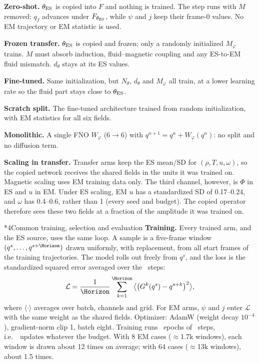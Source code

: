 \documentclass[10pt,letterpaper,twocolumn]{article}
\makeatletter
\renewcommand\section{\@startsection{section}{1}{0pt}{8pt}{4pt}{\normalfont\fontsize{11}{13}\bfseries}}
\makeatother
\begin{document}
\textbf{Zero-shot.} $\theta_{\rm ES}$ is copied into $F$ and nothing is trained.
The step runs with $M$ removed: $q_f$ advances under $F_{\theta_{\rm ES}}$, while $\psi$ and $j$ keep their frame-0 values.
No EM trajectory or EM statistic is used.

\textbf{Frozen transfer.} $\theta_{\rm ES}$ is copied and frozen; only a randomly initialized $M_\varphi$ trains.
$M$ must absorb induction, fluid--magnetic coupling and any ES-to-EM fluid mismatch.
$d_\theta$ stays at its ES values.

\textbf{Fine-tuned.} Same initialization, but $N_\theta$, $d_\theta$ and $M_\varphi$ all train, at a lower learning rate so the fluid part stays close to $\theta_{\rm ES}$.

\textbf{Scratch split.} The fine-tuned architecture trained from random initialization, with EM statistics for all six fields.

\textbf{Monolithic.} A single FNO $W_\varphi$ ($6\!\to\!6$) with $q^{n+1}=q^n+W_\varphi(q^n)$: no split and no diffusion term.

\textbf{Scaling in transfer.} Transfer arms keep the ES mean/SD for $(\rho,T,u,\omega)$, so the copied network receives the shared fields in the units it was trained on.
Magnetic scaling uses EM training data only.
The third channel, however, is $\Phi$ in ES and $u$ in EM.
Under ES scaling, EM $u$ has a standardized SD of 0.17--0.24, and $\omega$ has 0.4--0.6, rather than 1 (every seed and budget).
The copied operator therefore sees these two fields at a fraction of the amplitude it was trained on.

\section*{4\quad Common training, selection and evaluation}
\textbf{Training.} Every trained arm, and the ES source, uses the same loop.
A sample is a five-frame window $(q^s,\dots,q^{s+\Horizon})$ drawn uniformly, with replacement, from all start frames of the training trajectories.
The model rolls out freely from $q^s$, and the loss is the standardized squared error averaged over the \Horizon\ steps:
\begin{equation*}
\mathcal L=\frac{1}{\Horizon}\sum_{k=1}^{\Horizon}\big\langle\big(G^{k}(q^s)-q^{s+k}\big)^2\big\rangle,
\end{equation*}
where $\langle\cdot\rangle$ averages over batch, channels and grid.
For EM arms, $\psi$ and $j$ enter $\mathcal L$ with the same weight as the shared fields.
Optimizer: AdamW (weight decay $10^{-4}$), gradient-norm clip 1, batch eight.
Training runs \Epochs\ epochs of \StepsPerEpoch\ steps, i.e.\ \Updates\ updates whatever the budget.
With 8 EM cases ($\approx$1.7k windows), each window is drawn about 12 times on average; with 64 cases ($\approx$13k windows), about 1.5 times.
\end{document}
